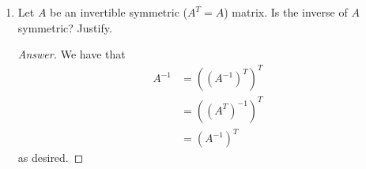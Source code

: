 \documentclass[../psets.tex]{subfiles}
\begin{document}
\begin{enumerate}[label={\textbf{6.\arabic*.}}]
\begin{proof}[Answer]
\begin{align*}
\begin{pmatrix}
                0 & 0 & 0 & 0 & 1\\
            \end{pmatrix}&
            T_2 &=
            \begin{pmatrix}
                1 & 0 & 0 & 0 & 0\\
                0 & 1 & 0 & a & 0\\
                0 & 0 & 1 & 0 & 0\\
                0 & 0 & 0 & 1 & 0\\
                0 & 0 & 0 & 0 & 1\\
            \end{pmatrix}
        \end{align*}
        The inverse transformation of $T_1$ exchanges $x_2$ and $x_4$ back, leaving everything else the same. The inverse transformation of $T_2$ subtracts $ax_4$ from the second slot, leaving everything else the same. Thus,
        \begin{align*}
            T_1^{-1} &=
            \begin{pmatrix}
                1 & 0 & 0 & 0 & 0\\
                0 & 0 & 0 & 1 & 0\\
                0 & 0 & 1 & 0 & 0\\
                0 & 1 & 0 & 0 & 0\\
                0 & 0 & 0 & 0 & 1\\
            \end{pmatrix}&
            T_2^{-1} &=
            \begin{pmatrix}
                1 & 0 & 0 & 0 & 0\\
                0 & 1 & 0 & -a & 0\\
                0 & 0 & 1 & 0 & 0\\
                0 & 0 & 0 & 1 & 0\\
                0 & 0 & 0 & 0 & 1\\
            \end{pmatrix}
        \end{align*}
    \end{proof}
    \setcounter{enumi}{12}
    \item Let $A$ be an invertible symmetric ($A^T=A$) matrix. Is the inverse of $A$ symmetric? Justify.
    \begin{proof}[Answer]
        We have that
        \begin{align*}
            A^{-1} &= ((A^{-1})^T)^T\\
            &= ((A^T)^{-1})^T\\
            &= (A^{-1})^T
        \end{align*}
        as desired.
    \end{proof}
\end{enumerate}
\end{document}
